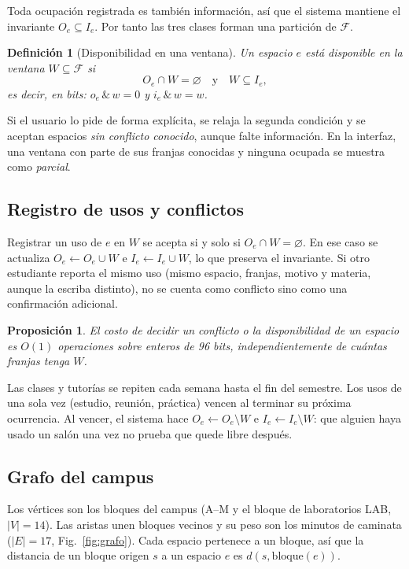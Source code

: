 \documentclass[conference,a4paper]{IEEEtran}
\newtheorem{definicion}{Definición}
\newtheorem{proposicion}{Proposición}
\newcommand{\F}{\mathcal{F}}
\begin{document}
Toda ocupación registrada es también información, así que el sistema mantiene el
invariante $O_e\subseteq I_e$. Por tanto las tres clases forman una partición de $\F$.

\begin{definicion}[Disponibilidad en una ventana]
Un espacio $e$ está \emph{disponible} en la ventana $W\subseteq\F$ si
\[
  O_e\cap W=\varnothing \quad\text{y}\quad W\subseteq I_e,
\]
es decir, en bits: $o_e\,\&\,w = 0$ y $i_e\,\&\,w = w$.
\end{definicion}

Si el usuario lo pide de forma explícita, se relaja la segunda condición y se aceptan
espacios \emph{sin conflicto conocido}, aunque falte información. En la interfaz, una
ventana con parte de sus franjas conocidas y ninguna ocupada se muestra como
\emph{parcial}.

\subsection{Registro de usos y conflictos}
Registrar un uso de $e$ en $W$ se acepta si y solo si $O_e\cap W=\varnothing$. En ese
caso se actualiza $O_e\leftarrow O_e\cup W$ e $I_e\leftarrow I_e\cup W$, lo que
preserva el invariante. Si otro estudiante reporta el mismo uso (mismo espacio,
franjas, motivo y materia, aunque la escriba distinto), no se cuenta como conflicto
sino como una confirmación adicional.

\begin{proposicion}
El costo de decidir un conflicto o la disponibilidad de un espacio es $O(1)$
operaciones sobre enteros de 96 bits, independientemente de cuántas franjas tenga
$W$.
\end{proposicion}

Las clases y tutorías se repiten cada semana hasta el fin del semestre. Los usos de
una sola vez (estudio, reunión, práctica) vencen al terminar su próxima ocurrencia.
Al vencer, el sistema hace $O_e\leftarrow O_e\setminus W$ e
$I_e\leftarrow I_e\setminus W$: que alguien haya usado un salón una vez no prueba que
quede libre después.

\subsection{Grafo del campus}
Los vértices son los bloques del campus (A--M y el bloque de laboratorios LAB,
$|V|=14$). Las aristas unen bloques vecinos y su peso son los minutos de caminata
($|E|=17$, Fig.~\ref{fig:grafo}). Cada espacio pertenece a un bloque, así que la
distancia de un bloque origen $s$ a un espacio $e$ es $d(s,\text{bloque}(e))$.
\end{document}
